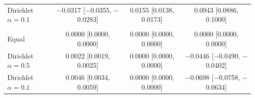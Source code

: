 \begin{tabular}{lccc}
Dirichlet $\alpha=0.1$ & $-$0.0317 [$-$0.0355, $-$0.0283] & 0.0155 [0.0138, 0.0173] & 0.0943 [0.0886, 0.1000] \\
\addlinespace
\multicolumn{4}{@{}l}{\textit{Heart, XGBoost}} \\
Equal & 0.0000 [0.0000, 0.0000] & 0.0000 [0.0000, 0.0000] & 0.0000 [0.0000, 0.0000] \\
Dirichlet $\alpha=0.5$ & 0.0022 [0.0019, 0.0025] & 0.0000 [0.0000, 0.0000] & $-$0.0446 [$-$0.0490, $-$0.0402] \\
Dirichlet $\alpha=0.1$ & 0.0046 [0.0034, 0.0059] & 0.0000 [0.0000, 0.0000] & $-$0.0698 [$-$0.0758, $-$0.0634] \\
\bottomrule
\end{tabular}
